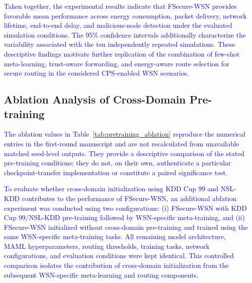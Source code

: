 \documentclass[pdflatex,sn-mathphys-num]{sn-jnl}
\newcommand{\Revised}[1]{\textcolor{blue}{#1}}
\begin{document}
\textcolor{blue}{Taken together, the experimental results indicate that
FSecure-WSN provides favorable mean performance across energy consumption,
packet delivery, network lifetime, end-to-end delay, and malicious-node
detection under the evaluated simulation conditions. The 95\% confidence
intervals additionally characterize the variability associated with the ten
independently repeated simulations. These descriptive findings motivate further replication of
the combination of few-shot meta-learning, trust-aware forwarding, and energy-aware
route selection for secure routing in the considered CPS-enabled WSN
scenarios.}

\subsection{Ablation Analysis of Cross-Domain Pre-training}\label{sec:pretraining_ablation}
\Revised{The ablation values in Table~\ref{tab:pretraining_ablation} reproduce the numerical entries in the first-round manuscript and are not recalculated from unavailable matched seed-level outputs. They provide a descriptive comparison of the stated pre-training conditions; they do not, on their own, authenticate a particular checkpoint-transfer implementation or constitute a paired significance test.}

\textcolor{blue}{To evaluate whether cross-domain initialization using
KDD Cup 99 and NSL-KDD contributes to the performance of FSecure-WSN, an
additional ablation experiment was conducted using two configurations:
(i) FSecure-WSN with KDD Cup 99/NSL-KDD pre-training followed by WSN-specific
meta-training, and (ii) FSecure-WSN initialized without cross-domain
pre-training and trained using the same WSN-specific meta-training tasks.
All remaining model architecture, MAML hyperparameters, routing thresholds,
training tasks, network configurations, and evaluation conditions were kept
identical. This controlled comparison isolates the contribution of
cross-domain initialization from the subsequent WSN-specific meta-learning
and routing components.}
\end{document}
